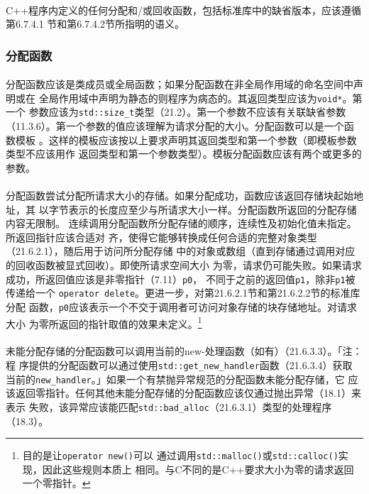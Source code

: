 \paragraph{}
C++程序内定义的任何分配和/或回收函数，包括标准库中的缺省版本，应该遵循第6.7.4.1
节和第6.7.4.2节所指明的语义。

\subsubsection{分配函数}
\paragraph{}
分配函数应该是类成员或全局函数；如果分配函数在非全局作用域的命名空间中声明或在
全局作用域中声明为静态的则程序为病态的。其返回类型应该为\texttt{void*}。第一个
参数应该为\texttt{std::size\_t}类型（21.2）。第一个参数不应该有关联缺省参数
（11.3.6）。第一个参数的值应该理解为请求分配的大小。分配函数可以是一个函数模板
。这样的模板应该按以上要求声明其返回类型和第一个参数（即模板参数类型不应该用作
返回类型和第一个参数类型）。模板分配函数应该有两个或更多的参数。

\paragraph{}
分配函数尝试分配所请求大小的存储。如果分配成功，函数应该返回存储块起始地址，其
以字节表示的长度应至少与所请求大小一样。分配函数所返回的分配存储内容无限制。
连续调用分配函数所分配存储的顺序，连续性及初始化值未指定。所返回指针应该合适对
齐，使得它能够转换成任何合适的完整对象类型（21.6.2.1），随后用于访问所分配存储
中的对象或数组（直到存储通过调用对应的回收函数被显式回收）。即使所请求空间大小
为零，请求仍可能失败。如果请求成功，所返回值应该是非零指针（7.11）\texttt{p0}，
不同于之前的返回值\texttt{p1}，除非\texttt{p1}被传递给一个
\texttt{operator delete}。更进一步，对第21.6.2.1节和第21.6.2.2节的标准库分配
函数，\texttt{p0}应该表示一个不交于调用者可访问对象存储的块存储地址。对请求大小
为零所返回的指针取值的效果未定义。\footnote{目的是让\texttt{operator new()}可以
通过调用\texttt{std::malloc()}或\texttt{std::calloc()}实现，因此这些规则本质上
相同。与C不同的是C++要求大小为零的请求返回一个零指针。}

\paragraph{}
未能分配存储的分配函数可以调用当前的new-处理函数（如有）（21.6.3.3）。「注：程
序提供的分配函数可以通过使用\texttt{std::get\_new\_handler}函数（21.6.3.4）获取
当前的\texttt{new\_handler}。」如果一个有禁抛异常规范的分配函数未能分配存储，它
应该返回零指针。任何其他未能分配存储的分配函数应该仅通过抛出异常（18.1）来表示
失败，该异常应该能匹配\texttt{std::bad\_alloc}（21.6.3.1）类型的处理程序
（18.3）。

